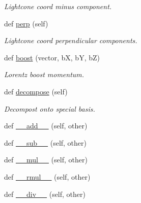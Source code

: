\begin{DoxyCompactItemize}
\begin{DoxyCompactList}\small\item\em Lightcone coord minus component. \end{DoxyCompactList}\item 
def \hyperlink{class_py_spinor_1_1_momenta_1_1_momenta_a8c2b3a331198822100b2c40e2c3bfafe}{perp} (self)
\begin{DoxyCompactList}\small\item\em Lightcone coord perpendicular components. \end{DoxyCompactList}\item 
def \hyperlink{class_py_spinor_1_1_momenta_1_1_momenta_a8d9de08e70234df6af0d5f52ec793ec8}{boost} (vector, b\+X, b\+Y, b\+Z)
\begin{DoxyCompactList}\small\item\em Lorentz boost momentum. \end{DoxyCompactList}\item 
def \hyperlink{class_py_spinor_1_1_momenta_1_1_momenta_a9c45e296964970075bff55375f5fa083}{decompose} (self)
\begin{DoxyCompactList}\small\item\em Decompost onto special basis. \end{DoxyCompactList}\item 
def \hyperlink{class_py_spinor_1_1_momenta_1_1_momenta_aeb69846d3abfbdc89c2b00edee57d1bf}{\+\_\+\+\_\+add\+\_\+\+\_\+} (self, other)
\item 
def \hyperlink{class_py_spinor_1_1_momenta_1_1_momenta_a6216736ecda0d13749b256cf7c5e1063}{\+\_\+\+\_\+sub\+\_\+\+\_\+} (self, other)
\item 
def \hyperlink{class_py_spinor_1_1_momenta_1_1_momenta_ab2e817c69a9fcd21e926b8bee794c522}{\+\_\+\+\_\+mul\+\_\+\+\_\+} (self, other)
\item 
def \hyperlink{class_py_spinor_1_1_momenta_1_1_momenta_a60fdd62c88311ad0fe38db1972d69433}{\+\_\+\+\_\+rmul\+\_\+\+\_\+} (self, other)
\item 
def \hyperlink{class_py_spinor_1_1_momenta_1_1_momenta_a90d55b09d7dee4e246bc8068a292659c}{\+\_\+\+\_\+div\+\_\+\+\_\+} (self, other)
\end{DoxyCompactItemize}
